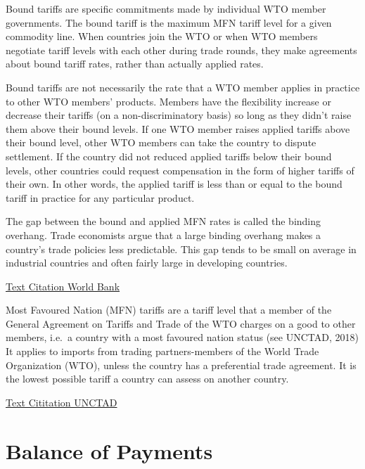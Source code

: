 \documentclass[
]{article}
\begin{document}
Bound tariffs are specific commitments made by individual WTO member
governments. The bound tariff is the maximum MFN tariff level for a
given commodity line. When countries join the WTO or when WTO members
negotiate tariff levels with each other during trade rounds, they make
agreements about bound tariff rates, rather than actually applied rates.

Bound tariffs are not necessarily the rate that a WTO member applies in
practice to other WTO members' products. Members have the flexibility
increase or decrease their tariffs (on a non-discriminatory basis) so
long as they didn't raise them above their bound levels. If one WTO
member raises applied tariffs above their bound level, other WTO members
can take the country to dispute settlement. If the country did not
reduced applied tariffs below their bound levels, other countries could
request compensation in the form of higher tariffs of their own. In
other words, the applied tariff is less than or equal to the bound
tariff in practice for any particular product.

The gap between the bound and applied MFN rates is called the binding
overhang. Trade economists argue that a large binding overhang makes a
country's trade policies less predictable. This gap tends to be small on
average in industrial countries and often fairly large in developing
countries.

\href{https://wits.worldbank.org/wits/wits/witshelp/content/data_retrieval/p/intro/c2.types_of_tariffs.htm}{Text
Citation World Bank}

Most Favoured Nation (MFN) tariffs are a tariff level that a member of
the General Agreement on Tariffs and Trade of the WTO charges on a good
to other members, i.e.~a country with a most favoured nation status (see
UNCTAD, 2018) It applies to imports from trading partners-members of the
World Trade Organization (WTO), unless the country has a preferential
trade agreement. It is the lowest possible tariff a country can assess
on another country.

\href{https://sdgpulse.unctad.org/glossary/mfn-tariffs/}{Text Cititation
UNCTAD}

\hypertarget{balance-of-payments}{%
\section{Balance of Payments}\label{balance-of-payments}}
\end{document}
